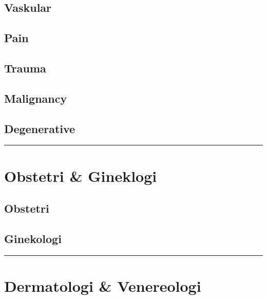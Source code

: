 \documentclass[
]{book}
\begin{document}
\hypertarget{vaskular}{%
\subsection{Vaskular}\label{vaskular}}

\hypertarget{pain}{%
\subsection{Pain}\label{pain}}

\hypertarget{trauma-1}{%
\subsection{Trauma}\label{trauma-1}}

\hypertarget{malignancy-3}{%
\subsection{Malignancy}\label{malignancy-3}}

\hypertarget{degenerative}{%
\subsection{Degenerative}\label{degenerative}}

\begin{center}\rule{0.5\linewidth}{0.5pt}\end{center}

\hypertarget{obstetri-gineklogi-1}{%
\section{Obstetri \& Gineklogi}\label{obstetri-gineklogi-1}}

\hypertarget{obstetri}{%
\subsection{Obstetri}\label{obstetri}}

\hypertarget{ginekologi}{%
\subsection{Ginekologi}\label{ginekologi}}

\begin{center}\rule{0.5\linewidth}{0.5pt}\end{center}

\hypertarget{dermatologi-venereologi}{%
\section{Dermatologi \& Venereologi}\label{dermatologi-venereologi}}
\end{document}
